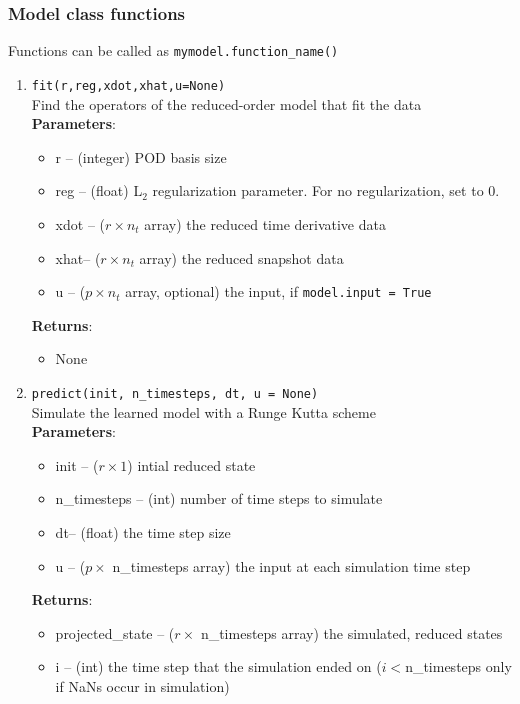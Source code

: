 \documentclass[11pt]{article} %
\newcommand{\code}[1]{\colorbox{light-gray}{\texttt{#1}}}
\begin{document}
\subsubsection{Model class functions}
\label{sec:modelclassfunctions}
Functions can be called as \code{mymodel.function\_name()}
\begin{enumerate}
\item{\code{fit(r,reg,xdot,xhat,u=None)}}\\
Find the operators of the reduced-order model that fit the data \\
\textbf{Parameters}:
	\begin{itemize}
		\item[] r -- (integer) POD basis size
		\item[]reg -- (float) L$_2$ regularization parameter. For no regularization, set to 0.
		\item[] xdot -- ($r \times n_t$ array) the reduced time derivative data
		\item[]xhat-- ($r \times n_t$ array) the reduced snapshot data
		\item[]u -- ($p \times n_t$ array, optional) the input, if \code{model.input = True}
	\end{itemize}
\textbf{Returns}:
\begin{itemize}
\item[] None
\end{itemize}


\item \code{predict(init, n\_timesteps, dt, u = None)}\\
Simulate the learned model with a Runge Kutta scheme\\
\textbf{Parameters}:
	\begin{itemize}
		\item[] init -- ($r \times 1$) intial reduced state
		\item[]n\_timesteps -- (int) number of time steps to simulate
		\item[]dt-- (float) the time step size
		\item[]u -- ($p \times$ n\_timesteps array) the input at each simulation time step 
	\end{itemize}
\textbf{Returns}:
\begin{itemize}
\item[] projected\_state -- ($r \times$ n\_timesteps array) the simulated, reduced states
\item[] i -- (int) the time step that the simulation ended on ($ i < $n\_timesteps only if NaNs occur in simulation)
\end{itemize}


\end{enumerate}
\end{document}
